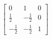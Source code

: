 \begin{displaymath}
 \begin{bmatrix}
  0 & 1 & 0 \\
  \frac{1}{2} & -\frac{1}{2} & 0 \\
  -\frac{1}{2} & -\frac{1}{2} & 1 
 \end{bmatrix}
\end{displaymath}
